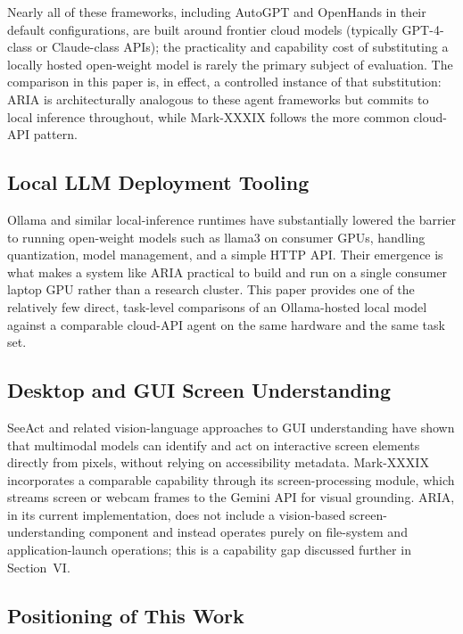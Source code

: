 \documentclass[conference]{IEEEtran}
\begin{document}
Nearly all of these frameworks, including AutoGPT and OpenHands in their default configurations, are built around frontier cloud models (typically GPT-4-class or Claude-class \cite{ref9} APIs); the practicality and capability cost of substituting a locally hosted open-weight model is rarely the primary subject of evaluation. The comparison in this paper is, in effect, a controlled instance of that substitution: ARIA is architecturally analogous to these agent frameworks but commits to local inference throughout, while Mark-XXXIX follows the more common cloud-API pattern.

\subsection{Local LLM Deployment Tooling}

Ollama \cite{ref2} and similar local-inference runtimes have substantially lowered the barrier to running open-weight models such as llama3 on consumer GPUs, handling quantization, model management, and a simple HTTP API. Their emergence is what makes a system like ARIA practical to build and run on a single consumer laptop GPU rather than a research cluster. This paper provides one of the relatively few direct, task-level comparisons of an Ollama-hosted local model against a comparable cloud-API agent on the same hardware and the same task set.

\subsection{Desktop and GUI Screen Understanding}

SeeAct \cite{ref10} and related vision-language approaches to GUI understanding have shown that multimodal models can identify and act on interactive screen elements directly from pixels, without relying on accessibility metadata. Mark-XXXIX incorporates a comparable capability through its screen-processing module, which streams screen or webcam frames to the Gemini API for visual grounding. ARIA, in its current implementation, does not include a vision-based screen-understanding component and instead operates purely on file-system and application-launch operations; this is a capability gap discussed further in Section~VI.

\subsection{Positioning of This Work}
\end{document}
